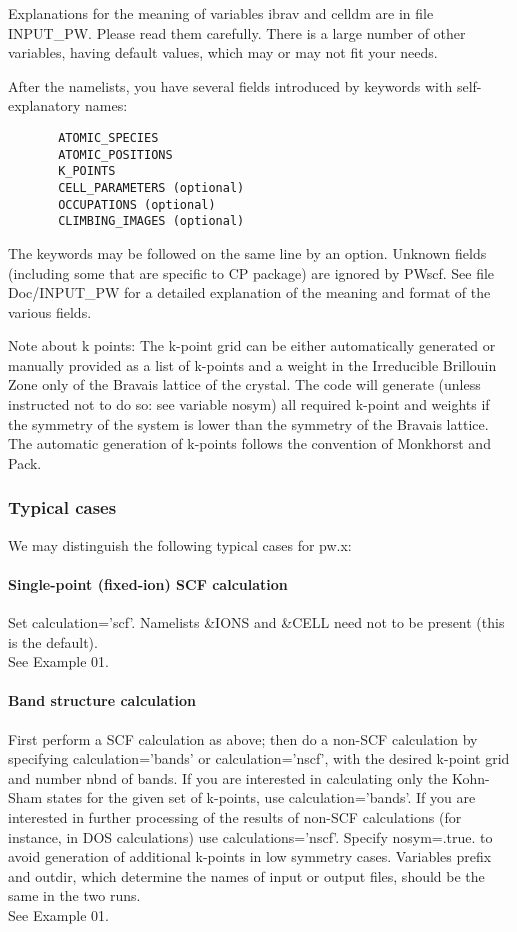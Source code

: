 \documentclass[12pt,a4paper]{article}
\begin{document}
Explanations for the meaning of variables ibrav and celldm are in file
INPUT\_PW. Please read them carefully. There is a large number of other
variables, having default values, which may or may not fit your needs.
    
After the namelists, you have several fields introduced by keywords with
self-explanatory names:
\begin{verbatim}
       ATOMIC_SPECIES
       ATOMIC_POSITIONS
       K_POINTS
       CELL_PARAMETERS (optional)
       OCCUPATIONS (optional)
       CLIMBING_IMAGES (optional)
\end{verbatim}
The keywords may be followed on the same line by an option. Unknown
fields (including some that are specific to CP package) are ignored by PWscf.
See file Doc/INPUT\_PW for a detailed explanation of the meaning and format
of the various fields.
    
Note about k points: The k-point grid can be either automatically generated 
or manually provided as a list of k-points and a weight in the Irreducible
Brillouin Zone only of the Bravais lattice of the crystal. The code will 
generate (unless instructed not to do so: see variable nosym) all
required k-point 
and weights if the symmetry of the system is lower than the symmetry of the
Bravais lattice. The automatic generation of k-points follows the convention
of Monkhorst and Pack.

\subsubsection{Typical cases}
We may distinguish the following typical cases for pw.x:

\paragraph{Single-point (fixed-ion) SCF calculation} 
Set calculation='scf'.
Namelists \&IONS and \&CELL need not to be present (this is the default).\\
See Example 01.

\paragraph{Band structure calculation}
First perform a SCF calculation as above;
then do a non-SCF calculation by specifying calculation='bands' or
calculation='nscf', with the desired k-point grid and number nbnd
of bands. If you are interested in calculating only the Kohn-Sham states
for the given set of k-points, use calculation='bands'. If you are
interested in further processing of the results of non-SCF calculations
(for instance, in DOS calculations) use calculations='nscf'.
Specify nosym=.true. to avoid generation of additional k-points in
low symmetry cases. Variables prefix and outdir, which determine
the names of input or output files, should be the same in the two runs.\\
See Example 01.
\end{document}
